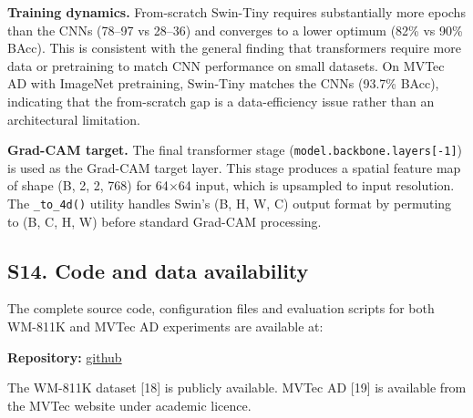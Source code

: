 \documentclass[11pt,a4paper]{article}
\begin{document}
\textbf{Training dynamics.} From-scratch Swin-Tiny requires substantially more epochs than the CNNs (78--97 vs 28--36) and converges to a lower optimum (82\% vs 90\% BAcc). This is consistent with the general finding that transformers require more data or pretraining to match CNN performance on small datasets. On MVTec AD with ImageNet pretraining, Swin-Tiny matches the CNNs (93.7\% BAcc), indicating that the from-scratch gap is a data-efficiency issue rather than an architectural limitation.

\textbf{Grad-CAM target.} The final transformer stage (\texttt{model.backbone.layers[-1]}) is used as the Grad-CAM target layer. This stage produces a spatial feature map of shape (B, 2, 2, 768) for 64$\times$64 input, which is upsampled to input resolution. The \texttt{\_to\_4d()} utility handles Swin's (B, H, W, C) output format by permuting to (B, C, H, W) before standard Grad-CAM processing.

\subsection*{S14. Code and data availability}

The complete source code, configuration files and evaluation scripts for both WM-811K and MVTec AD experiments are available at:

\textbf{Repository:} \href{https://github.com/JasperJia33/native-readout-xai}{github}

The WM-811K dataset [18] is publicly available. MVTec AD [19] is available from the MVTec website under academic licence.
\end{document}
